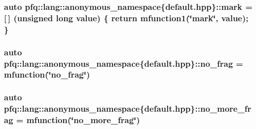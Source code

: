 \hypertarget{namespacepfq_1_1lang_1_1anonymous__namespace_02default_8hpp_03_a7b831baeabda070b89ca862a9445a4a8}{
\subsubsection[{mark}]{\setlength{\rightskip}{0pt plus 5cm}auto pfq\+::lang\+::anonymous\+\_\+namespace\{default.\+hpp\}\+::mark = \mbox{[}$\,$\mbox{]} (unsigned long value) \{ return {\bf mfunction1}(\char`\"{}mark\char`\"{}, value); \}}}\label{namespacepfq_1_1lang_1_1anonymous__namespace_02default_8hpp_03_a7b831baeabda070b89ca862a9445a4a8}
\hypertarget{namespacepfq_1_1lang_1_1anonymous__namespace_02default_8hpp_03_a4cfaf018f687a1563161b8f4245a6652}{
\subsubsection[{no\+\_\+frag}]{\setlength{\rightskip}{0pt plus 5cm}auto pfq\+::lang\+::anonymous\+\_\+namespace\{default.\+hpp\}\+::no\+\_\+frag = {\bf mfunction}(\char`\"{}no\+\_\+frag\char`\"{})}}\label{namespacepfq_1_1lang_1_1anonymous__namespace_02default_8hpp_03_a4cfaf018f687a1563161b8f4245a6652}
\hypertarget{namespacepfq_1_1lang_1_1anonymous__namespace_02default_8hpp_03_a88628ce70e2a650af1338851373b9891}{
\subsubsection[{no\+\_\+more\+\_\+frag}]{\setlength{\rightskip}{0pt plus 5cm}auto pfq\+::lang\+::anonymous\+\_\+namespace\{default.\+hpp\}\+::no\+\_\+more\+\_\+frag = {\bf mfunction}(\char`\"{}no\+\_\+more\+\_\+frag\char`\"{})}}\label{namespacepfq_1_1lang_1_1anonymous__namespace_02default_8hpp_03_a88628ce70e2a650af1338851373b9891}
